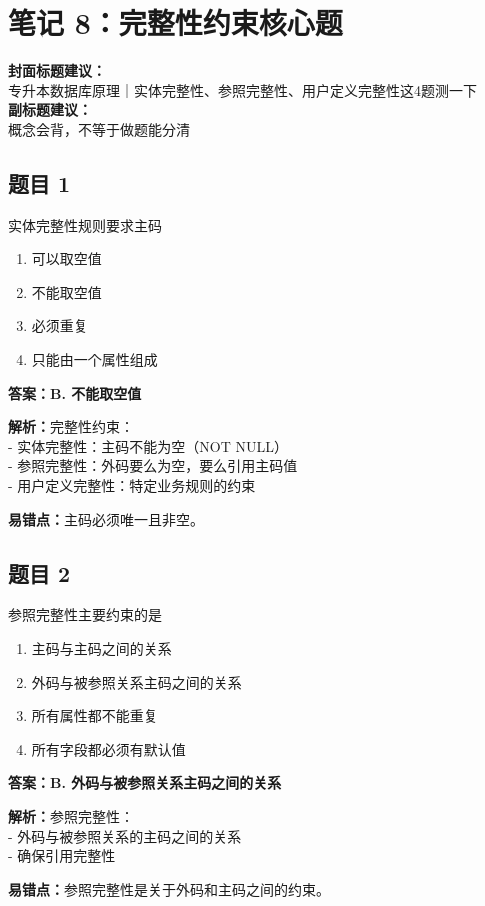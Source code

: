 \documentclass[12pt,a4paper]{ctexart}
\begin{document}
\newpage

\section{笔记 8：完整性约束核心题}
\begin{coverbox}
	\textbf{封面标题建议：}\\
	专升本数据库原理｜实体完整性、参照完整性、用户定义完整性这4题测一下\\
	\textbf{副标题建议：}\\
	概念会背，不等于做题能分清
\end{coverbox}

\subsection*{题目 1}
实体完整性规则要求主码
\begin{enumerate}[label=\Alph*.]
	\item 可以取空值
	\item 不能取空值
	\item 必须重复
	\item 只能由一个属性组成
\end{enumerate}

\begin{answerbox}
	\textbf{答案：B. 不能取空值}

	\textbf{解析：}完整性约束：\\
	- 实体完整性：主码不能为空（NOT NULL）\\
	- 参照完整性：外码要么为空，要么引用主码值\\
	- 用户定义完整性：特定业务规则的约束

	\textbf{易错点：}主码必须唯一且非空。
\end{answerbox}

\subsection*{题目 2}
参照完整性主要约束的是
\begin{enumerate}[label=\Alph*.]
	\item 主码与主码之间的关系
	\item 外码与被参照关系主码之间的关系
	\item 所有属性都不能重复
	\item 所有字段都必须有默认值
\end{enumerate}

\begin{answerbox}
	\textbf{答案：B. 外码与被参照关系主码之间的关系}

	\textbf{解析：}参照完整性：\\
	- 外码与被参照关系的主码之间的关系\\
	- 确保引用完整性

	\textbf{易错点：}参照完整性是关于外码和主码之间的约束。
\end{answerbox}
\end{document}
